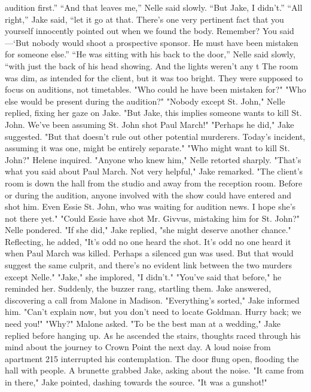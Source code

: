 \documentclass{novel}
\begin{document}
audition first.” “And that leaves me,” Nelle said slowly. “But Jake, I didn’t.” “All right,” Jake said, “let it go at that. There’s one very pertinent fact that you yourself innocently pointed out when we found the body. Remember? You said—‘But nobody would shoot a prospective sponsor. He must have been mistaken for someone else.” “He was sitting with his back to the door,” Nelle said slowly, “with just the back of his head showing. And the lights weren’t any t The room was dim, as intended for the client, but it was too bright. They were supposed to focus on auditions, not timetables. "Who could he have been mistaken for?" "Who else would be present during the audition?" "Nobody except St. John," Nelle replied, fixing her gaze on Jake. "But Jake, this implies someone wants to kill St. John. We've been assuming St. John shot Paul March!" "Perhaps he did," Jake suggested. "But that doesn't rule out other potential murderers. Today's incident, assuming it was one, might be entirely separate." "Who might want to kill St. John?" Helene inquired. "Anyone who knew him," Nelle retorted sharply. "That's what you said about Paul March. Not very helpful," Jake remarked. "The client's room is down the hall from the studio and away from the reception room. Before or during the audition, anyone involved with the show could have entered and shot him. Even Essie St. John, who was waiting for audition news. I hope she's not there yet." "Could Essie have shot Mr. Givvus, mistaking him for St. John?" Nelle pondered. "If she did," Jake replied, "she might deserve another chance." Reflecting, he added, "It's odd no one heard the shot. It's odd no one heard it when Paul March was killed. Perhaps a silenced gun was used. But that would suggest the same culprit, and there's no evident link between the two murders except Nelle." "Jake," she implored, "I didn't." "You've said that before," he reminded her. Suddenly, the buzzer rang, startling them. Jake answered, discovering a call from Malone in Madison. "Everything's sorted," Jake informed him. "Can't explain now, but you don't need to locate Goldman. Hurry back; we need you!" "Why?" Malone asked. "To be the best man at a wedding," Jake replied before hanging up. As he ascended the stairs, thoughts raced through his mind about the journey to Crown Point the next day. A loud noise from apartment 215 interrupted his contemplation. The door flung open, flooding the hall with people. A brunette grabbed Jake, asking about the noise. "It came from in there," Jake pointed, dashing towards the source. "It was a gunshot!"
\end{document}
